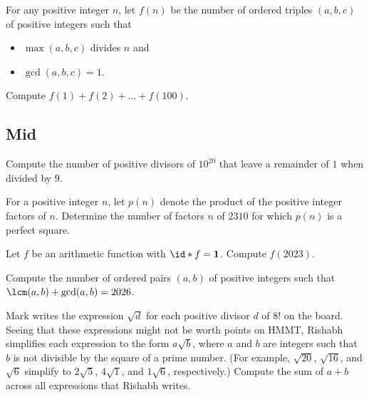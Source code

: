 \documentclass[11pt]{scrartcl}
\begin{document}
\begin{problem} %
    For any positive integer $n$, let $f(n)$ be the number of ordered triples $(a, b, c)$ of positive integers such that
    \begin{itemize}
        \item $\max(a, b, c)$ divides $n$ and
        \item $\gcd(a, b, c) = 1$.
    \end{itemize}
    Compute $f(1) + f(2) + \dots + f(100)$.
\end{problem}

\subsection{Mid}

\begin{problem} %
    Compute the number of positive divisors of $10^{20}$ that leave a remainder of $1$ when divided by $9$.
\end{problem}

\begin{problem} %
    For a positive integer $n$, let $p(n)$ denote the product of the positive integer factors of $n$. Determine the number of factors $n$ of $2310$ for which $p(n)$ is a perfect square.
\end{problem}

\begin{problem}[AMC 12A 2023/22]
	\label{pro:amc12}
	Let $f$ be an arithmetic function with $\id \ast f = \mathbf 1$. Compute $f(2023)$.
\end{problem}

\begin{problem} %
    Compute the number of ordered pairs $(a,b)$ of positive integers such that $\lcm(a,b) + \gcd(a,b) = 2026$.
\end{problem}

\begin{problem} %
    Mark writes the expression $\sqrt{d}$ for each positive divisor $d$ of $8!$ on the board. Seeing that these expressions might not be worth points on HMMT, Rishabh simplifies each expression to the form $a\sqrt{b}$, where $a$ and $b$ are integers such that $b$ is not divisible by the square of a prime number. (For example, $\sqrt{20}$, $\sqrt{16}$, and $\sqrt{6}$ simplify to $2\sqrt{5}$, $4\sqrt{1}$, and $1\sqrt{6}$, respectively.) Compute the sum of $a + b$ across all expressions that Rishabh writes.
\end{problem}
\end{document}
